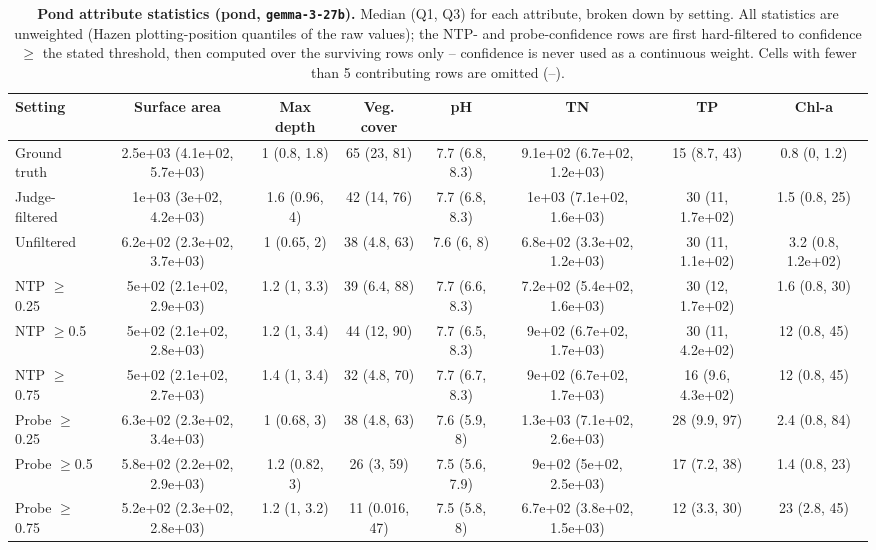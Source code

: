 \begin{table}[ht]
\centering
\begin{tabular}{lccccccc}
\toprule
Setting & Surface area & Max depth & Veg. cover & pH & TN & TP & Chl-a \\
\midrule
Ground truth & 2.5e+03 (4.1e+02, 5.7e+03) & 1 (0.8, 1.8) & 65 (23, 81) & 7.7 (6.8, 8.3) & 9.1e+02 (6.7e+02, 1.2e+03) & 15 (8.7, 43) & 0.8 (0, 1.2) \\
Judge-filtered & 1e+03 (3e+02, 4.2e+03) & 1.6 (0.96, 4) & 42 (14, 76) & 7.7 (6.8, 8.3) & 1e+03 (7.1e+02, 1.6e+03) & 30 (11, 1.7e+02) & 1.5 (0.8, 25) \\
Unfiltered & 6.2e+02 (2.3e+02, 3.7e+03) & 1 (0.65, 2) & 38 (4.8, 63) & 7.6 (6, 8) & 6.8e+02 (3.3e+02, 1.2e+03) & 30 (11, 1.1e+02) & 3.2 (0.8, 1.2e+02) \\
NTP $\geq$0.25 & 5e+02 (2.1e+02, 2.9e+03) & 1.2 (1, 3.3) & 39 (6.4, 88) & 7.7 (6.6, 8.3) & 7.2e+02 (5.4e+02, 1.6e+03) & 30 (12, 1.7e+02) & 1.6 (0.8, 30) \\
NTP $\geq$0.5 & 5e+02 (2.1e+02, 2.8e+03) & 1.2 (1, 3.4) & 44 (12, 90) & 7.7 (6.5, 8.3) & 9e+02 (6.7e+02, 1.7e+03) & 30 (11, 4.2e+02) & 12 (0.8, 45) \\
NTP $\geq$0.75 & 5e+02 (2.1e+02, 2.7e+03) & 1.4 (1, 3.4) & 32 (4.8, 70) & 7.7 (6.7, 8.3) & 9e+02 (6.7e+02, 1.7e+03) & 16 (9.6, 4.3e+02) & 12 (0.8, 45) \\
Probe $\geq$0.25 & 6.3e+02 (2.3e+02, 3.4e+03) & 1 (0.68, 3) & 38 (4.8, 63) & 7.6 (5.9, 8) & 1.3e+03 (7.1e+02, 2.6e+03) & 28 (9.9, 97) & 2.4 (0.8, 84) \\
Probe $\geq$0.5 & 5.8e+02 (2.2e+02, 2.9e+03) & 1.2 (0.82, 3) & 26 (3, 59) & 7.5 (5.6, 7.9) & 9e+02 (5e+02, 2.5e+03) & 17 (7.2, 38) & 1.4 (0.8, 23) \\
Probe $\geq$0.75 & 5.2e+02 (2.3e+02, 2.8e+03) & 1.2 (1, 3.2) & 11 (0.016, 47) & 7.5 (5.8, 8) & 6.7e+02 (3.8e+02, 1.5e+03) & 12 (3.3, 30) & 23 (2.8, 45) \\
\bottomrule
\end{tabular}
\caption{\textbf{Pond attribute statistics (pond, \texttt{gemma-3-27b}).} Median (Q1, Q3) for each attribute, broken down by setting. All statistics are unweighted (Hazen plotting-position quantiles of the raw values); the NTP- and probe-confidence rows are first hard-filtered to confidence $\geq$ the stated threshold, then computed over the surviving rows only -- confidence is never used as a continuous weight. Cells with fewer than 5 contributing rows are omitted (--).}
\label{tab:meta-pond-gemma-3-27b-pond}
\end{table}

